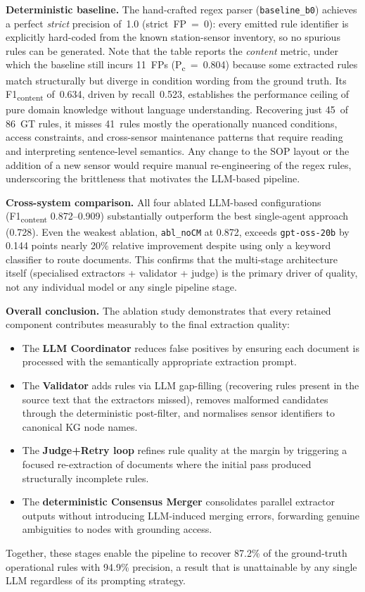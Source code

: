 ﻿\documentclass[11pt]{article}
\begin{document}
\textbf{Deterministic baseline.}
The hand-crafted regex parser (\texttt{baseline\_b0}) achieves a perfect
\emph{strict} precision of~1.0 (strict~FP~=~0): every emitted rule identifier is
explicitly hard-coded from the known station-sensor inventory, so no spurious rules
can be generated.
Note that the table reports the \emph{content} metric, under which the baseline
still incurs 11~FPs (P\textsubscript{c}~=~0.804) because some extracted rules
match structurally but diverge in condition wording from the ground truth.
Its F1\textsubscript{content} of~0.634, driven by recall~0.523,
establishes the performance ceiling of pure domain knowledge without language
understanding.
Recovering just 45~of 86~GT rules, it misses 41~rules mostly the operationally
nuanced conditions, access constraints, and cross-sensor maintenance patterns that
require reading and interpreting sentence-level semantics.
Any change to the SOP layout or the addition of a new sensor would require
manual re-engineering of the regex rules, underscoring the brittleness that
motivates the LLM-based pipeline.

\textbf{Cross-system comparison.}
All four ablated LLM-based configurations (F1\textsubscript{content} 0.872--0.909)
substantially outperform the best single-agent approach (0.728).
Even the weakest ablation, \texttt{abl\_noCM} at 0.872, exceeds \texttt{gpt-oss-20b}
by 0.144 points nearly 20\% relative improvement despite using only a keyword
classifier to route documents.
This confirms that the multi-stage architecture itself (specialised extractors +
validator + judge) is the primary driver of quality, not any individual model or
any single pipeline stage.

\textbf{Overall conclusion.}
The ablation study demonstrates that every retained component contributes measurably
to the final extraction quality:
\begin{itemize}
    \item The \textbf{LLM Coordinator} reduces false positives by ensuring each
          document is processed with the semantically appropriate extraction prompt.
    \item The \textbf{Validator} adds rules via LLM gap-filling (recovering rules
          present in the source text that the extractors missed), removes malformed
          candidates through the deterministic post-filter, and normalises sensor
          identifiers to canonical KG node names.
    \item The \textbf{Judge+Retry loop} refines rule quality at the margin by
          triggering a focused re-extraction of documents where the initial pass
          produced structurally incomplete rules.
    \item The \textbf{deterministic Consensus Merger} consolidates parallel extractor
          outputs without introducing LLM-induced merging errors, forwarding genuine
          ambiguities to nodes with grounding access.
\end{itemize}
Together, these stages enable the pipeline to recover 87.2\% of the ground-truth
operational rules with 94.9\% precision, a result that is unattainable by any
single LLM regardless of its prompting strategy.
\end{document}
